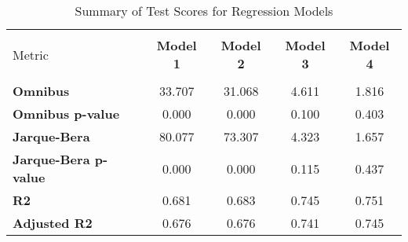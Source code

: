 
    \begin{table}
        \centering
        \caption{Summary of Test Scores for Regression Models}
        \vspace{10pt}
        \label{tab:test_scores}
        \begin{tabular}{lcccc}
        \hline
        \hline \\[-1.8ex]
    Metric & \textbf{Model 1} & \textbf{Model 2} & \textbf{Model 3} & \textbf{Model 4} \\
\hline \\[-1.8ex] 
\textbf{Omnibus} & 33.707 & 31.068 & 4.611 & 1.816 \\
\textbf{Omnibus p-value} & 0.000 & 0.000 & 0.100 & 0.403 \\
\textbf{Jarque-Bera} & 80.077 & 73.307 & 4.323 & 1.657 \\
\textbf{Jarque-Bera p-value} & 0.000 & 0.000 & 0.115 & 0.437 \\
\textbf{R2} & 0.681 & 0.683 & 0.745 & 0.751 \\
\textbf{Adjusted R2} & 0.676 & 0.676 & 0.741 & 0.745 \\

        \hline
        \hline
        \end{tabular}
    \end{table}
    